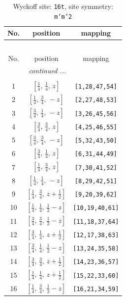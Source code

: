 \documentclass[fleqn,8pt]{jsarticle}
\begin{document}
\renewcommand{\arraystretch}{1.2}
\begin{longtable}{ccc}
\caption{Wyckoff site: {\tt 16t}, site symmetry: {\tt m'm'2}}
 \\
 \hline \hline
No. & position & mapping \\ \hline \endfirsthead

\multicolumn{2}{l}{\tablename\ \thetable{}} \\
 \hline \hline
No. & position & mapping \\ \hline \endhead

 \hline \hline
\multicolumn{2}{r}{\footnotesize\it continued ...} \\ \endfoot

 \hline \hline
\multicolumn{2}{r}{} \\ \endlastfoot

1 & $\left[ \frac{1}{4},\, \frac{1}{4},\, z \right]$ & {\tt [1,28,47,54]} \\ \hline
2 & $\left[ \frac{1}{4},\, \frac{3}{4},\, - z \right]$ & {\tt [2,27,48,53]} \\ \hline
3 & $\left[ \frac{3}{4},\, \frac{1}{4},\, - z \right]$ & {\tt [3,26,45,56]} \\ \hline
4 & $\left[ \frac{3}{4},\, \frac{3}{4},\, z \right]$ & {\tt [4,25,46,55]} \\ \hline
5 & $\left[ \frac{3}{4},\, \frac{3}{4},\, - z \right]$ & {\tt [5,32,43,50]} \\ \hline
6 & $\left[ \frac{3}{4},\, \frac{1}{4},\, z \right]$ & {\tt [6,31,44,49]} \\ \hline
7 & $\left[ \frac{1}{4},\, \frac{3}{4},\, z \right]$ & {\tt [7,30,41,52]} \\ \hline
8 & $\left[ \frac{1}{4},\, \frac{1}{4},\, - z \right]$ & {\tt [8,29,42,51]} \\ \hline
9 & $\left[ \frac{1}{4},\, \frac{3}{4},\, z + \frac{1}{2} \right]$ & {\tt [9,20,39,62]} \\ \hline
10 & $\left[ \frac{1}{4},\, \frac{1}{4},\, \frac{1}{2} - z \right]$ & {\tt [10,19,40,61]} \\ \hline
11 & $\left[ \frac{3}{4},\, \frac{3}{4},\, \frac{1}{2} - z \right]$ & {\tt [11,18,37,64]} \\ \hline
12 & $\left[ \frac{3}{4},\, \frac{1}{4},\, z + \frac{1}{2} \right]$ & {\tt [12,17,38,63]} \\ \hline
13 & $\left[ \frac{3}{4},\, \frac{1}{4},\, \frac{1}{2} - z \right]$ & {\tt [13,24,35,58]} \\ \hline
14 & $\left[ \frac{3}{4},\, \frac{3}{4},\, z + \frac{1}{2} \right]$ & {\tt [14,23,36,57]} \\ \hline
15 & $\left[ \frac{1}{4},\, \frac{1}{4},\, z + \frac{1}{2} \right]$ & {\tt [15,22,33,60]} \\ \hline
16 & $\left[ \frac{1}{4},\, \frac{3}{4},\, \frac{1}{2} - z \right]$ & {\tt [16,21,34,59]} \\
\end{longtable}
\end{document}
